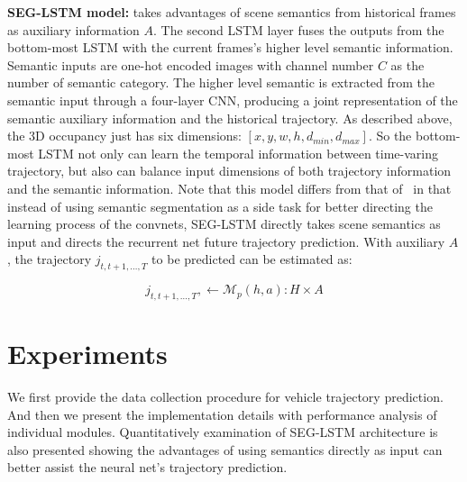 \documentclass[10pt,twocolumn,letterpaper]{article}
\begin{document}
\vspace{\baselineskip}
\noindent \textbf{SEG-LSTM model:}
 takes advantages of scene semantics from  historical frames as auxiliary information $A$. The second LSTM layer fuses the outputs from the bottom-most LSTM with the current frames's higher level semantic information. Semantic inputs are one-hot encoded images with channel number $C$ as the number of semantic category. The higher level semantic is extracted from the semantic input through a four-layer CNN, producing a joint representation of the semantic auxiliary information and the historical trajectory.  As described above, the 3D occupancy just has six dimensions: $[x, y, w, h, d_{min}, d_{max}]$. So the bottom-most LSTM not only can learn the temporal information between time-varing trajectory,  but also can balance input dimensions of both trajectory information and the semantic information.
Note that this model differs from that of~\cite{xu2017end} in that instead of using semantic segmentation as a side task for better directing the learning process of the convnets, SEG-LSTM directly takes scene semantics as input and directs the recurrent net future trajectory prediction. With auxiliary $A$, the trajectory  $j_{t, t+1, \ldots, T}$  to be predicted can be estimated as:

\begin{equation}
j_{t, t+1, \ldots, T}, \leftarrow  \bm{\mathcal{M}}_p(h, a): H \times A
\label{eq:SEG-LSTM}
\end{equation}

\section{Experiments}

We first provide the data collection procedure for vehicle trajectory prediction. And then we present the implementation details with performance analysis of individual modules. Quantitatively examination of SEG-LSTM architecture is also presented showing the advantages of using semantics directly as input can better assist the neural net's trajectory prediction.
\end{document}

